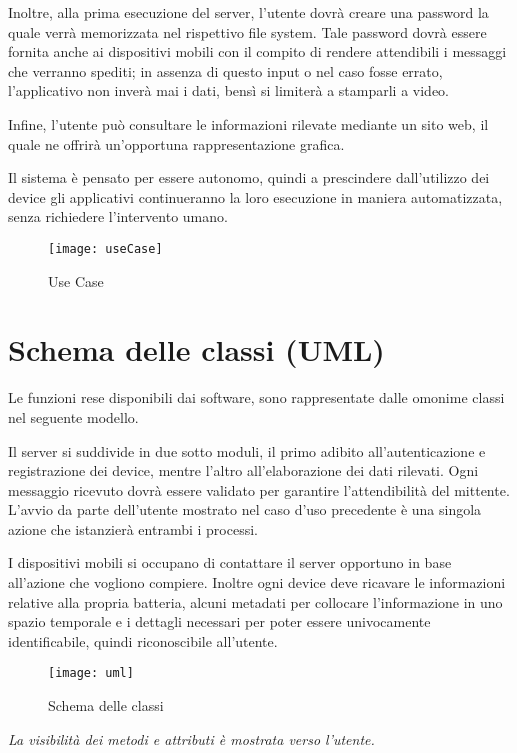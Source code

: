 \documentclass[target=bach]{thud}
\begin{document}
    Inoltre, alla prima esecuzione del server, l'utente dovrà creare una password la quale verrà memorizzata nel rispettivo file system. Tale password dovrà essere fornita anche ai dispositivi mobili con il compito di rendere attendibili i messaggi che verranno spediti; in assenza di questo input o nel caso fosse errato, l'applicativo non inverà mai i dati, bensì si limiterà a stamparli a video.\

    Infine, l'utente può consultare le informazioni rilevate mediante un sito web, il quale ne offrirà un'opportuna rappresentazione grafica.

    Il sistema è pensato per essere autonomo, quindi a prescindere dall'utilizzo dei device gli applicativi continueranno la loro esecuzione in maniera automatizzata, senza richiedere l'intervento umano.


\graphicspath{ {./img/} }
\begin{figure}[h]
\centering
\texttt{[image: useCase]}
\caption{Use Case}
\label{fig:usecase}
\end{figure}


\section{Schema delle classi (UML)}

    Le funzioni rese disponibili dai software, sono rappresentate dalle omonime classi nel seguente modello.

    Il server si suddivide in due sotto moduli, il primo adibito all'autenticazione e registrazione dei device, mentre l'altro all'elaborazione dei dati rilevati. Ogni messaggio ricevuto dovrà essere validato per garantire l'attendibilità del mittente.
    L’avvio da parte dell’utente mostrato nel caso d’uso precedente è una singola azione che istanzierà entrambi i processi.


    I dispositivi mobili si occupano di contattare il server opportuno in base all'azione che vogliono compiere. Inoltre ogni device deve ricavare le informazioni relative alla propria batteria, alcuni metadati per collocare l'informazione in uno spazio temporale e i dettagli necessari per poter essere univocamente identificabile, quindi riconoscibile all'utente.
\newpage
    \begin{figure}[h]
    	\centering
    	\texttt{[image: uml]}
    	\caption{Schema delle classi}
    	\label{fig:uml}
    \end{figure}
    \textit{La visibilità dei metodi e attributi è mostrata verso l'utente.}
\end{document}
